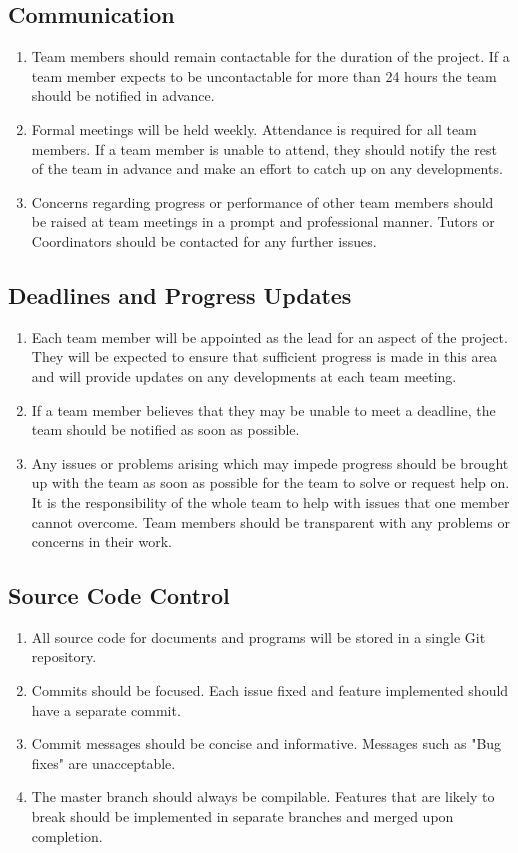 \documentclass[a4paper]{article}
\begin{document}
\subsection{Communication}
\begin{enumerate}[label=(\alph*)]
	\item Team members should remain contactable for the duration of the project. If a team member expects to be uncontactable for more than 24 hours the team should be notified in advance.
	\item Formal meetings will be held weekly. Attendance is required for all team members. If a team member is unable to attend, they should notify the rest of the team in advance and make an effort to catch up on any developments.
	\item Concerns regarding progress or performance of other team members should be raised at team meetings in a prompt and professional manner. Tutors or Coordinators should be contacted for any further issues. 
\end{enumerate}

\subsection{Deadlines and Progress Updates}
\begin{enumerate}[label=(\alph*)]
	\item Each team member will be appointed as the lead for an aspect of the project. They will be expected to ensure that sufficient progress is made in this area and will provide updates on any developments at each team meeting. 
	\item If a team member believes that they may be unable to meet a deadline, the team should be notified as soon as possible.
	\item Any issues or problems arising which may impede progress should be brought up with the team as soon as possible for the team to solve or request help on. It is the responsibility of the whole team to help with issues that one member cannot overcome. Team members should be transparent with any problems or concerns in their work.
\end{enumerate}

\subsection{Source Code Control}
\begin{enumerate}[label=(\alph*)]
	\item All source code for documents and programs will be stored in a single Git repository.
	\item Commits should be focused. Each issue fixed and feature implemented should have a separate commit.
	\item Commit messages should be concise and informative. Messages such as "Bug fixes" are unacceptable.
	\item The master branch should always be compilable. Features that are likely to break should  be implemented in separate branches and merged upon completion.
\end{enumerate}
\end{document}
